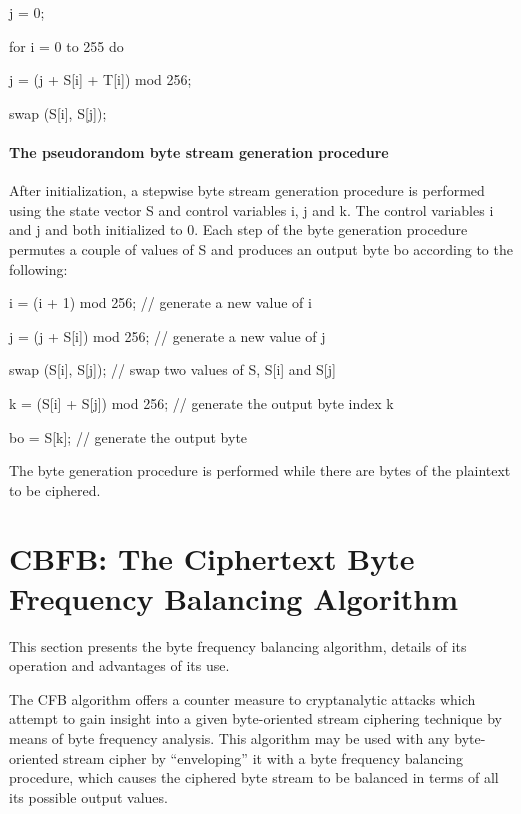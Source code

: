 \documentclass[conference]{IEEEtran}
\begin{document}
j = 0;

for i = 0 to 255 do  

   j = (j + S[i] + T[i]) mod 256;
   
   swap (S[i], S[j]);


\paragraph{The pseudorandom byte stream generation procedure}

After initialization, a stepwise byte stream generation procedure is performed using the state vector S and control variables i, j and k. The control variables i and j and both initialized to 0. Each step of the byte generation procedure permutes a couple of values of S and produces an output byte bo according to the following:

   i = (i + 1) mod 256;       		// generate a new value of i
   
       j = (j + S[i]) mod 256;      // generate a new value of j
       
       swap (S[i], S[j]);           	// swap two values of S, S[i] and S[j]
       
       k = (S[i] + S[j]) mod 256;   	// generate the output byte index k
       
       bo = S[k];                   	// generate the output byte

The byte generation procedure is performed while there are bytes of the plaintext to be ciphered.

\section{CBFB: The Ciphertext Byte Frequency Balancing Algorithm}

This section presents the byte frequency balancing algorithm, details of its operation and advantages of its use.

The CFB algorithm offers a counter measure to cryptanalytic attacks which attempt to gain insight into a given byte-oriented stream ciphering technique by means of byte frequency analysis. This algorithm may be used with any byte-oriented stream cipher by “enveloping” it with a byte frequency balancing procedure, which causes the ciphered byte stream to be balanced in terms of all its  possible output values.
\end{document}
